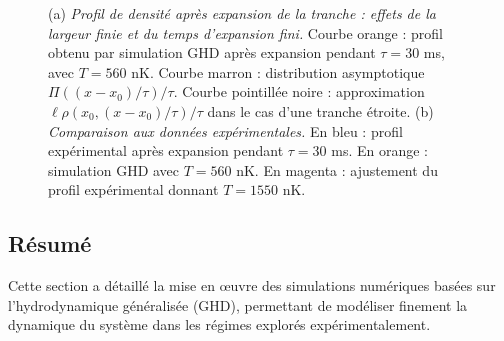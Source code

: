 \begin{figure}[!htb]
\centering
{}
\caption{(a) {\it Profil de densité après expansion de la tranche : effets de la largeur finie et du temps d’expansion fini.} Courbe orange : profil obtenu par simulation GHD après expansion pendant $\tau = 30$ ms, avec $T = 560$ nK. Courbe marron : distribution asymptotique $\Pi((x - x_0)/\tau)/\tau$. Courbe pointillée noire : approximation $\ell \rho(x_0, (x - x_0)/\tau)/\tau$ dans le cas d’une tranche étroite. (b) {\it Comparaison aux données expérimentales.} En bleu : profil expérimental après expansion pendant $\tau = 30$ ms. En orange : simulation GHD avec $T = 560$ nK. En magenta : ajustement du profil expérimental donnant $T = 1550$ nK.}
\label{fig:simul_expansion}
\end{figure}

\subsection*{Résumé}

Cette section a détaillé la mise en œuvre des simulations numériques basées sur l’hydrodynamique généralisée (GHD), permettant de modéliser finement la dynamique du système dans les régimes explorés expérimentalement.

